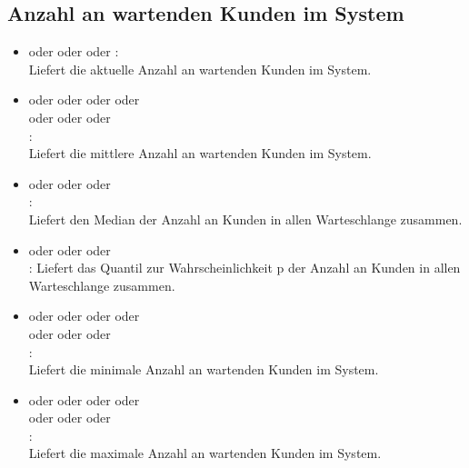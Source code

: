 


\subsection{Anzahl an wartenden Kunden im System}

\begin{itemize}    

\item
{} oder  oder  oder :\\
Liefert die aktuelle Anzahl an wartenden Kunden im System.

\item
{} oder  oder  oder  oder\\
 oder  oder  oder\\
:\\
Liefert die mittlere Anzahl an wartenden Kunden im System.

\item
{} oder  oder  oder\\
:\\
Liefert den Median der Anzahl an Kunden in allen Warteschlange zusammen.

\item
{} oder  oder  oder\\
:
Liefert das Quantil zur Wahrscheinlichkeit p der Anzahl an Kunden in allen Warteschlange zusammen.

\item
{} oder  oder  oder  oder\\
 oder  oder  oder\\
:\\
Liefert die minimale Anzahl an wartenden Kunden im System.

\item
{} oder  oder  oder  oder\\
 oder  oder  oder\\
:\\
Liefert die maximale Anzahl an wartenden Kunden im System.


\end{itemize}
